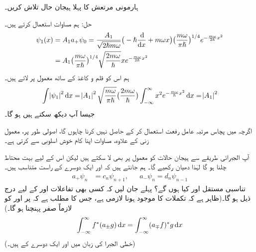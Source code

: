 ہارمونی مرتعش کا پہلا ہیجان حال تلاش کریں۔ 

حل:\quad
 ہم مساوات  استعمال کرتے ہیں۔ 
\begin{gather}
\begin{aligned}\label{مساوات_شروڈنگر_ہارمونی_ہیجان_حالات}
\psi_1 (x) &= A_1 a_+ \psi_0 = \frac{ A_1 }{ \sqrt{ 2 \hslash m \omega } } \big( -\hslash \frac{\dif}{\dif x} + m \omega x\big) \big( \frac{ m \omega}{ \pi \hslash} \big)^{1/4} e^{-\frac{ m \omega }{ 2 \hslash } x^2}\\
 &= A_1 \big( \frac{ m \omega }{ \pi \hslash}\big)^{1/4} \sqrt{ \frac{ 2 m \omega }{ \hslash} } x e^{-\frac{ m \omega }{ 2 \hslash } x^2}
\end{aligned}
\end{gather}
ہم اس کو قلم و کاغذ کے ساتھ معمول پر لاتے ہیں۔ 
\begin{align*}
\int \abs{\psi_1}^2 \dif x = \abs{A_1 }^2 \sqrt{ \frac{ m \omega}{ \pi \hslash } } \big( \frac{ 2 m \omega }{ \hslash} \big ) \int_{ - \infty }^{ \infty } x^2 e^{-\frac{ m \omega }{ \hslash } x^2} \dif x = \abs{A_1}^2
\end{align*} 
جیسا آپ دیکھ سکتے ہیں  ہو گا۔
 
اگرچہ میں پچاس مرتبہ عامل رفعت استعمال کر کے  حاصل نہیں کرنا چاہوں گا، اصولی طور پر، معمول زنی کے علاوہ، مساوات  اپنا کام خوش اسلوبی سے کرتی ہے۔

 آپ الجبرائی طریقے سے ہیجان حالات کو معمول پر بھی لا سکتے ہیں لیکن اس کے لیے بہت محتاط چلنا ہو گا لہٰذا دھیان رکھیے گا۔ ہم جانتے ہیں کہ 
 اور  ایک دوسرے کے راست متناسب ہیں۔ 
\begin{align} 
a_+ \psi_n&= c_n \psi_{n+1} , && a_- \psi_n = d_n \psi_{n-1}
\end{align} 
 تناسبی مستقل  اور  کیا ہوں گے؟ پہلے جان لیں کہ کسی بھی تفاعلات  اور  کے لیے درج ذیل ہو گا۔(ظاہر ہے کہ تکملات کا موجود ہونا لازمی ہے، جس کا مطلب ہے کہ  پر  اور  کو لازماً صفر پہنچنا ہو گا۔)
\begin{align}\label{مساوات_شروڈنگر_سیڑھی_متبادل}
\int_{ - \infty }^{ \infty } f^*( a_{\pm} g ) \dif x = \int_{ - \infty }^{ \infty } ( a_{\mp} f)^* g \dif x
\end{align}
(خطی الجبرا کی زبان میں  اور  ایک دوسرے کے  ہیں۔)

